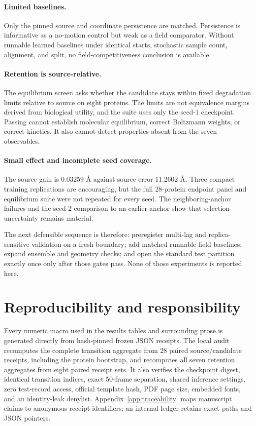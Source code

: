 \documentclass{article}
\begin{document}
\paragraph{Limited baselines.} Only the pinned source and coordinate persistence are matched. Persistence is informative as a no-motion control but weak as a field comparator. Without runnable learned baselines under identical starts, stochastic sample count, alignment, and split, no field-competitiveness conclusion is available.

\paragraph{Retention is source-relative.} The equilibrium screen asks whether the candidate stays within fixed degradation limits relative to source on eight proteins. The limits are not equivalence margins derived from biological utility, and the suite uses only the seed-1 checkpoint. Passing cannot establish molecular equilibrium, correct Boltzmann weights, or correct kinetics. It also cannot detect properties absent from the seven observables.

\paragraph{Small effect and incomplete seed coverage.} The source gain is 0.03259 \AA\@{} against source error 11.2602 \AA\@{}. Three compact training replications are encouraging, but the full 28-protein endpoint panel and equilibrium suite were not repeated for every seed. The neighboring-anchor failures and the seed-2 comparison to an earlier anchor show that selection uncertainty remains material.

The next defensible sequence is therefore: preregister multi-lag and replica-sensitive validation on a fresh boundary; add matched runnable field baselines; expand ensemble and geometry checks; and open the standard test partition exactly once only after those gates pass. None of those experiments is reported here.

\section{Reproducibility and responsibility}

Every numeric macro used in the results tables and surrounding prose is generated directly from hash-pinned frozen JSON receipts. The local audit recomputes the complete transition aggregate from 28 paired source/candidate receipts, including the protein bootstrap, and recomputes all seven retention aggregates from eight paired receipt sets. It also verifies the checkpoint digest, identical transition indices, exact 50-frame separation, shared inference settings, zero test-record access, official template hash, PDF page size, embedded fonts, and an identity-leak denylist. Appendix~\ref{app:traceability} maps manuscript claims to anonymous receipt identifiers; an internal ledger retains exact paths and JSON pointers.
\end{document}

